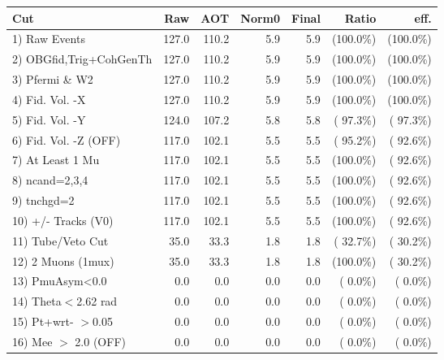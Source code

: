  \begin{table}[h!]\centering
 \begin{tabular}{||l||r|r|r|r|r|r||}
 \hline
 \hline
 Cut & Raw & AOT & Norm0 & Final & Ratio & eff.       \\
 \hline
  1) Raw Events           &        127.0 &        110.2 &          5.9 &          5.9 & (100.0\%) & (100.0\%) \\
  2) OBGfid,Trig+CohGenTh &        127.0 &        110.2 &          5.9 &          5.9 & (100.0\%) & (100.0\%) \\
  3) Pfermi \& W2         &        127.0 &        110.2 &          5.9 &          5.9 & (100.0\%) & (100.0\%) \\
  4) Fid. Vol. -X         &        127.0 &        110.2 &          5.9 &          5.9 & (100.0\%) & (100.0\%) \\
  5) Fid. Vol. -Y         &        124.0 &        107.2 &          5.8 &          5.8 & ( 97.3\%) & ( 97.3\%) \\
  6) Fid. Vol. -Z (OFF)   &        117.0 &        102.1 &          5.5 &          5.5 & ( 95.2\%) & ( 92.6\%) \\
  7) At Least 1 Mu        &        117.0 &        102.1 &          5.5 &          5.5 & (100.0\%) & ( 92.6\%) \\
  8) ncand=2,3,4          &        117.0 &        102.1 &          5.5 &          5.5 & (100.0\%) & ( 92.6\%) \\
  9) tnchgd=2             &        117.0 &        102.1 &          5.5 &          5.5 & (100.0\%) & ( 92.6\%) \\
 10) +/- Tracks (V0)      &        117.0 &        102.1 &          5.5 &          5.5 & (100.0\%) & ( 92.6\%) \\
 11) Tube/Veto Cut        &         35.0 &         33.3 &          1.8 &          1.8 & ( 32.7\%) & ( 30.2\%) \\
 12) 2 Muons (1mux)       &         35.0 &         33.3 &          1.8 &          1.8 & (100.0\%) & ( 30.2\%) \\
 13) PmuAsym<0.0          &          0.0 &          0.0 &          0.0 &          0.0 & (  0.0\%) & (  0.0\%) \\
 14) Theta$<$2.62 rad     &          0.0 &          0.0 &          0.0 &          0.0 & (  0.0\%) & (  0.0\%) \\
 15) Pt+wrt- $>$0.05      &          0.0 &          0.0 &          0.0 &          0.0 & (  0.0\%) & (  0.0\%) \\
 16) Mee $>$ 2.0  (OFF)   &          0.0 &          0.0 &          0.0 &          0.0 & (  0.0\%) & (  0.0\%) \\

\end{tabular}
\end{table}
